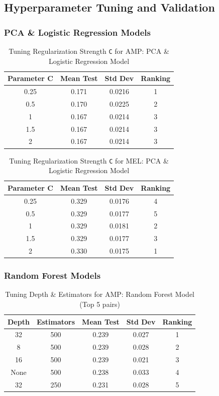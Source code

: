 \documentclass[11pt]{article}
\begin{document}
\newpage

\subsection{Hyperparameter Tuning and Validation}

\subsubsection{PCA \& Logistic Regression Models}
\begin{table}[H]
\centering
\caption{Tuning Regularization Strength \texttt{C} for AMP: PCA \& Logistic Regression Model}
\begin{tabular}{|c|c|c|c|}
 \toprule
 Parameter C & Mean Test & Std Dev  & Ranking\\
 \midrule
 0.25 & 0.171 & 0.0216 & 1\\
 0.5 & 0.170 & 0.0225 & 2\\
 1 & 0.167 & 0.0214 & 3\\
 1.5 & 0.167 & 0.0214 & 3\\
 2 & 0.167 & 0.0214 & 3\\
 \bottomrule
\end{tabular}
\end{table}

\begin{table}[H]
\centering
\caption{Tuning Regularization Strength \texttt{C} for MEL: PCA \& Logistic Regression Model}
\begin{tabular}{|c|c|c|c|}
 \toprule
 Parameter C & Mean Test & Std Dev  & Ranking\\
 \midrule
 0.25 & 0.329 & 0.0176 & 4\\
 0.5 & 0.329 & 0.0177 & 5\\
 1 & 0.329 & 0.0181 & 2\\
 1.5 & 0.329 & 0.0177 & 3\\
 2 & 0.330 & 0.0175 & 1\\
 \bottomrule
\end{tabular}
\end{table}

\subsubsection{Random Forest Models}
\begin{table}[H]
\centering
\caption{Tuning Depth \& Estimators for AMP: Random Forest Model (Top 5 pairs)}
\begin{tabular}{|c|c|c|c|c|}
 \toprule
 Depth & Estimators & Mean Test & Std Dev & Ranking\\
 \midrule
 32 & 500 & 0.239 & 0.027 & 1\\
 8 & 500 & 0.239 & 0.028 & 2\\
 16 & 500 & 0.239 & 0.021 & 3\\
 None & 500 & 0.238 & 0.033 & 4\\
 32 & 250 & 0.231 & 0.028 & 5\\
 \bottomrule
\end{tabular}
\end{table}
\end{document}
